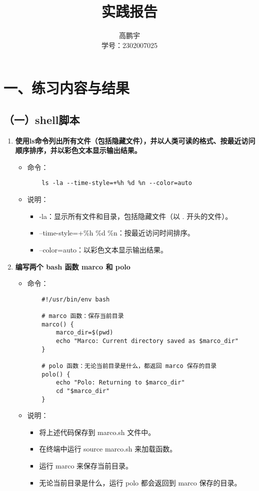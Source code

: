 \documentclass[UTF8]{ctexart}
\title{实践报告}
\author{高鹏宇\\ 学号：2302007025}
\date{}
\begin{document}
\maketitle

\section*{一、练习内容与结果}

\subsection*{（一）shell脚本}

\begin{enumerate}
  \item \textbf{使用ls命令列出所有文件（包括隐藏文件），并以人类可读的格式、按最近访问顺序排序，并以彩色文本显示输出结果。}
  \begin{itemize}
    \item 命令：
    \begin{verbatim}
    ls -la --time-style=+%h %d %n --color=auto
    \end{verbatim}
    \item 说明：
    \begin{itemize}
      \item -la：显示所有文件和目录，包括隐藏文件（以 . 开头的文件）。
      \item --time-style=+\%h \%d \%n：按最近访问时间排序。
      \item --color=auto：以彩色文本显示输出结果。
    \end{itemize}
  \end{itemize}

  \item \textbf{编写两个 bash 函数 marco 和 polo}
  \begin{itemize}
    \item 命令：
    \begin{verbatim}
    #!/usr/bin/env bash

    # marco 函数：保存当前目录
    marco() {
        marco_dir=$(pwd)
        echo "Marco: Current directory saved as $marco_dir"
    }

    # polo 函数：无论当前目录是什么，都返回 marco 保存的目录
    polo() {
        echo "Polo: Returning to $marco_dir"
        cd "$marco_dir"
    }
    \end{verbatim}
    \item 说明：
    \begin{itemize}
      \item 将上述代码保存到 marco.sh 文件中。
      \item 在终端中运行 source marco.sh 来加载函数。
      \item 运行 marco 来保存当前目录。
      \item 无论当前目录是什么，运行 polo 都会返回到 marco 保存的目录。
    \end{itemize}
  \end{itemize}


\end{enumerate}
\end{document}
